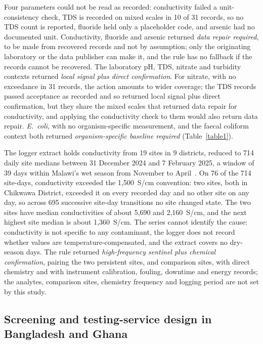 \documentclass[10pt,letterpaper]{article}
\begin{document}
Four parameters could not be read as recorded: conductivity failed a unit-consistency check, TDS is recorded on mixed scales in 10 of 31 records, so no TDS count is reported, fluoride held only a placeholder code, and arsenic had no documented unit. Conductivity, fluoride and arsenic returned \textit{data repair required}, to be made from recovered records and not by assumption; only the originating laboratory or the data publisher can make it, and the rule has no fallback if the records cannot be recovered. The laboratory pH, TDS, nitrate and turbidity contexts returned \textit{local signal plus direct confirmation}. For nitrate, with no exceedance in 31 records, the action amounts to wider coverage; the TDS records passed acceptance as recorded and so returned local signal plus direct confirmation, but they share the mixed scales that returned data repair for conductivity, and applying the conductivity check to them would also return data repair. \textit{E.~coli}, with no organism-specific measurement, and the faecal coliform context both returned \textit{organism-specific baseline required} (Table~\ref{table1}).

The logger extract holds conductivity from 19 sites in 9 districts, reduced to 714 daily site medians between 31 December 2024 and 7 February 2025, a window of 39 days within Malawi's wet season from November to April~\cite{BGS-Earthwise-Malawi}. On 76 of the 714 site-days, conductivity exceeded the 1,500~\textmu{}S/cm convention: two sites, both in Chikwawa District, exceeded it on every recorded day and no other site on any day, so across 695 successive site-day transitions no site changed state. The two sites have median conductivities of about 5,690 and 2,160~\textmu{}S/cm, and the next highest site median is about 1,360~\textmu{}S/cm. The series cannot identify the cause: conductivity is not specific to any contaminant, the logger does not record whether values are temperature-compensated, and the extract covers no dry-season days. The rule returned \textit{high-frequency sentinel plus chemical confirmation}, pairing the two persistent sites, and comparison sites, with direct chemistry and with instrument calibration, fouling, downtime and energy records; the analytes, comparison sites, chemistry frequency and logging period are not set by this study.

\subsection*{Screening and testing-service design in Bangladesh and Ghana}
\end{document}
